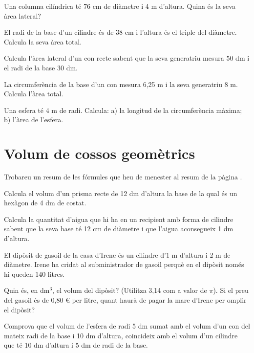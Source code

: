 \begin{mylist}
\exer Una columna cilíndrica té 76 cm de diàmetre i 4 m d'altura. Quina és la seva àrea lateral?

\exer  El radi de la base d'un cilindre és de 38 cm i l'altura és el triple del diàmetre. Calcula la seva àrea total.

\exer[1]  Calcula l'àrea lateral d'un con recte sabent que la seva generatriu mesura 50 dm i el radi de la base 30 dm.

\exer  La circumferència de la base d'un con mesura 6,25 m i la seva generatriu 8 m. Calcula l'àrea total.

\exer  Una esfera té 4 m de radi. Calcula: a) la longitud de la circumferència màxima; b) l'àrea de l'esfera.
\answers{[$L=8\pi=25.133$ m, $64\pi=201.062$ m$^2$]}

 
\end{mylist}


\section{Volum de cossos geomètrics}

\begin{theorybox}
	Trobareu un resum de les fórmules que heu de menester al resum de la pàgina \pageref{sec:resumvolums}.
\end{theorybox}

\begin{mylist}
\exer Calcula el volum d'un prisma recte de 12 dm d'altura la base de la qual és un hexàgon de 4 dm de costat.

\exer  Calcula la quantitat d'aigua que hi ha en un recipient amb forma de cilindre sabent que la seva base té 12 cm de diàmetre i que l'aigua aconsegueix 1 dm d'altura. 

\exer[1]  El dipòsit de gasoil de la casa d'Irene és un cilindre d'1 m d'altura i 2 m de diàmetre. Irene ha cridat al subministrador de gasoil perquè en el dipòsit només hi queden 140 litres.

\begin{tasks}
   \task Quin és, en dm${}^{3}$, el volum del dipòsit? (Utilitza 3,14 com a valor de $\pi$).
   \task Si el preu del gasoil és de 0,80 \euro{} per litre, quant haurà de pagar la mare d'Irene per omplir el dipòsit?
\end{tasks}
\answers{[$V=1000\pi=3140$ dm$^3$=litres, costarà 2400 \euro{}]}

\exer   Comprova que el volum de l'esfera de radi 5 dm sumat amb el volum d'un con del mateix radi de la base i 10 dm d'altura, coincideix amb el volum d'un cilindre que té 10 dm d'altura i 5 dm de radi de la base. 

\end{mylist}
 


